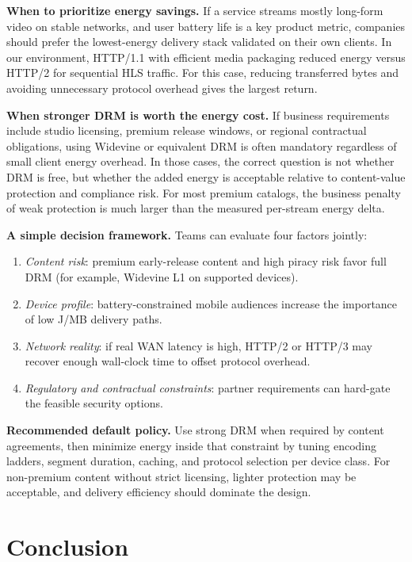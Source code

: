 \documentclass[conference]{IEEEtran}
\begin{document}
\textbf{When to prioritize energy savings.} If a service streams mostly long-form video on
stable networks, and user battery life is a key product metric, companies should prefer the
lowest-energy delivery stack validated on their own clients. In our environment, HTTP/1.1
with efficient media packaging reduced energy versus HTTP/2 for sequential HLS traffic.
For this case, reducing transferred bytes and avoiding unnecessary protocol overhead gives
the largest return.

\textbf{When stronger DRM is worth the energy cost.} If business requirements include studio
licensing, premium release windows, or regional contractual obligations, using Widevine or
equivalent DRM is often mandatory regardless of small client energy overhead. In those cases,
the correct question is not whether DRM is free, but whether the added energy is acceptable
relative to content-value protection and compliance risk. For most premium catalogs, the
business penalty of weak protection is much larger than the measured per-stream energy delta.

\textbf{A simple decision framework.} Teams can evaluate four factors jointly:
\begin{enumerate}
  \item \textit{Content risk}: premium early-release content and high piracy risk favor full
    DRM (for example, Widevine L1 on supported devices).
  \item \textit{Device profile}: battery-constrained mobile audiences increase the importance
    of low J/MB delivery paths.
  \item \textit{Network reality}: if real WAN latency is high, HTTP/2 or HTTP/3 may recover
    enough wall-clock time to offset protocol overhead.
  \item \textit{Regulatory and contractual constraints}: partner requirements can hard-gate the
    feasible security options.
\end{enumerate}

\textbf{Recommended default policy.} Use strong DRM when required by content agreements, then
minimize energy inside that constraint by tuning encoding ladders, segment duration, caching,
and protocol selection per device class. For non-premium content without strict licensing,
lighter protection may be acceptable, and delivery efficiency should dominate the design.


\section{Conclusion}
\end{document}
